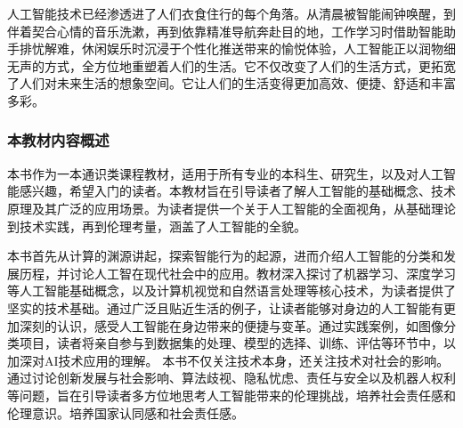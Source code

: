 人工智能技术已经渗透进了人们衣食住行的每个角落。从清晨被智能闹钟唤醒，到伴着契合心情的音乐洗漱，再到依靠精准导航奔赴目的地，工作学习时借助智能助手排忧解难，休闲娱乐时沉浸于个性化推送带来的愉悦体验，人工智能正以润物细无声的方式，全方位地重塑着人们的生活。它不仅改变了人们的生活方式，更拓宽了人们对未来生活的想象空间。它让人们的生活变得更加高效、便捷、舒适和丰富多彩。







\subsubsection*{\textbf{本教材内容概述}}
本书作为一本通识类课程教材，适用于所有专业的本科生、研究生，以及对人工智能感兴趣，希望入门的读者。本教材旨在引导读者了解人工智能的基础概念、技术原理及其广泛的应用场景。为读者提供一个关于人工智能的全面视角，从基础理论到技术实践，再到伦理考量，涵盖了人工智能的全貌。

本书首先从计算的渊源讲起，探索智能行为的起源，进而介绍人工智能的分类和发展历程，并讨论人工智在现代社会中的应用。教材深入探讨了机器学习、深度学习等人工智能基础概念，以及计算机视觉和自然语言处理等核心技术，为读者提供了坚实的技术基础。通过广泛且贴近生活的例子，让读者能够对身边的人工智能有更加深刻的认识，感受人工智能在身边带来的便捷与变革。通过实践案例，如图像分类项目，读者将亲自参与到数据集的处理、模型的选择、训练、评估等环节中，以加深对AI技术应用的理解。
本书不仅关注技术本身，还关注技术对社会的影响。通过讨论创新发展与社会影响、算法歧视、隐私忧虑、责任与安全以及机器人权利等问题，旨在引导读者多方位地思考人工智能带来的伦理挑战，培养社会责任感和伦理意识。培养国家认同感和社会责任感。